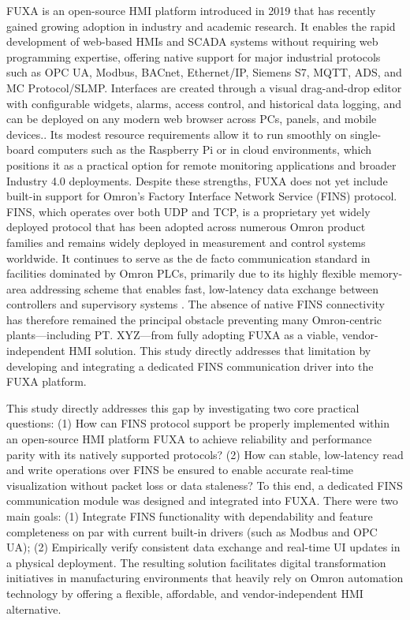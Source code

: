 FUXA is an open-source HMI platform introduced in 2019 that has recently gained growing adoption in industry and academic research. It enables the rapid development of web-based HMIs and SCADA systems without requiring web programming expertise, offering native support for major industrial protocols such as OPC UA, Modbus, BACnet, Ethernet/IP, Siemens S7, MQTT, ADS, and MC Protocol/SLMP. Interfaces are created through a visual drag-and-drop editor with configurable widgets, alarms, access control, and historical data logging, and can be deployed on any modern web browser across PCs, panels, and mobile devices.\cite{Jakob_Wrede_Weiss_Braeunig_2025, FrangoTeam_2025}. Its modest resource requirements allow it to run smoothly on single-board computers such as the Raspberry Pi or in cloud environments, which positions it as a practical option for remote monitoring applications and broader Industry 4.0 deployments.
Despite these strengths, FUXA does not yet include built-in support for Omron’s Factory Interface Network Service (FINS) protocol. FINS, which operates over both UDP and TCP, is a proprietary yet widely deployed protocol that has been adopted across numerous Omron product families and remains widely deployed in measurement and control systems worldwide. It continues to serve as the de facto communication standard in facilities dominated by Omron PLCs, primarily due to its highly flexible memory-area addressing scheme that enables fast, low-latency data exchange between controllers and supervisory systems \cite{gao2020new}. The absence of native FINS connectivity has therefore remained the principal obstacle preventing many Omron-centric plants—including PT. XYZ—from fully adopting FUXA as a viable, vendor-independent HMI solution. This study directly addresses that limitation by developing and integrating a dedicated FINS communication driver into the FUXA platform.

This study directly addresses this gap by investigating two core practical questions: (1) How can FINS protocol support be properly implemented within an open-source HMI platform FUXA to achieve reliability and performance parity with its natively supported protocols? (2) How can stable, low-latency read and write operations over FINS be ensured to enable accurate real-time visualization without packet loss or data staleness? To this end, a dedicated FINS communication module was designed and integrated into FUXA. There were two main goals: (1) Integrate FINS functionality with dependability and feature completeness on par with current built-in drivers (such as Modbus and OPC UA); (2) Empirically verify consistent data exchange and real-time UI updates in a physical deployment. The resulting solution facilitates digital transformation initiatives in manufacturing environments that heavily rely on Omron automation technology by offering a flexible, affordable, and vendor-independent HMI alternative. 

